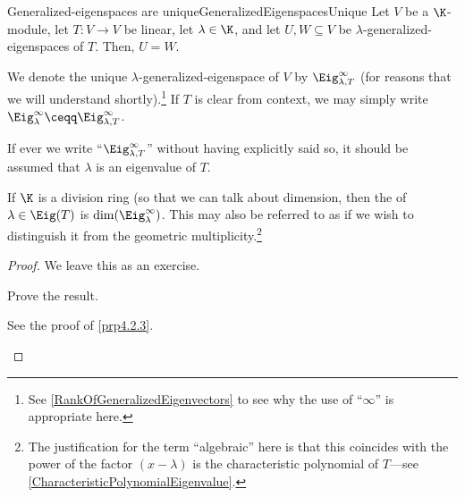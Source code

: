 \begin{prp}{Generalized-eigenspaces are u\-nique}{GeneralizedEigenspacesUnique}
	Let $V$ be a $\K$-module, let $T\colon V\rightarrow V$ be linear, let $\lambda \in \K$, and let $U,W\subseteq V$ be $\lambda$-generalized-eigenspaces of $T$.  Then, $U=W$.
	\begin{rmk}
		We denote the unique $\lambda$-generalized-eigenspace of $V$ by $\Eig _{\lambda ,T}^{\infty}$ (for reasons that we will understand shortly).\footnote{See \cref{RankOfGeneralizedEigenvectors} to see why the use of ``$\infty$'' is appropriate here.}  If $T$ is clear from context, we may simply write $\Eig _{\lambda}^{\infty}\ceqq \Eig _{\lambda ,T}^{\infty}$\index[notation]{$\Eig _{\lambda}^{\infty}$}.
	\end{rmk}
	\begin{rmk}
		If ever we write ``$\Eig _{\lambda ,T}^{\infty}$'' without having explicitly said so, it should be assumed that $\lambda$ is an eigenvalue of $T$.
	\end{rmk}
	\begin{rmk}
		If $\K$ is a division ring (so that we can talk about dimension, then the  of $\lambda \in \Eig (T)$ is $\dim (\Eig _{\lambda}^{\infty})$.  This may also be referred to as  if we wish to distinguish it from the geometric multiplicity.\footnote{The justification for the term ``algebraic'' here is that this coincides with the power of the factor $(x-\lambda )$ is the characteristic polynomial of $T$---see \cref{CharacteristicPolynomialEigenvalue}.}
	\end{rmk}
	\begin{proof}
		We leave this as an exercise.
		\begin{exr}[breakable=false]{}{}
			Prove the result.
			\begin{rmk}
				See the proof of \cref{prp4.2.3}.
			\end{rmk}
		\end{exr}
	\end{proof}
\end{prp}
